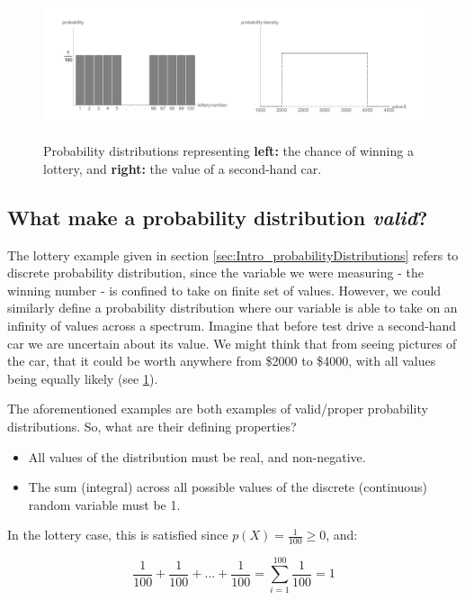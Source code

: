 \documentclass[11pt,fullpage]{book}
\begin{document}
\begin{figure}
\centering
\scalebox{0.3} 
{\includegraphics{Intro_lotterySecondhandCarProbability.pdf}}
\caption{Probability distributions representing \textbf{left:} the chance of winning a lottery, and \textbf{right:} the value of a second-hand car.}\label{fig:Intro_lotterySecondhandCarProbability}
\end{figure}

\subsection{What make a probability distribution \textit{valid}?}\label{sec:Intro_validProbabilityDistribution}
The lottery example given in section \ref{sec:Intro_probabilityDistributions} refers to discrete probability distribution, since the variable we were measuring - the winning number - is confined to take on finite set of values. However, we could similarly define a probability distribution where our variable is able to take on an infinity of values across a spectrum. Imagine that before test drive a second-hand car we are uncertain about its value. We might think that from seeing pictures of the car, that it could be worth anywhere from \$2000 to \$4000, with all values being equally likely (see \ref{fig:Intro_lotterySecondhandCarProbability}).

The aforementioned examples are both examples of valid/proper probability distributions. So, what are their defining properties?

\begin{itemize}
\item All values of the distribution must be real, and non-negative.
\item The sum (integral) across all possible values of the discrete (continuous) random variable must be 1.
\end{itemize}

In the lottery case, this is satisfied since $p(X)=\frac{1}{100}\geq 0$, and:

\begin{equation}
\frac{1}{100} + \frac{1}{100} + ... + \frac{1}{100} = \sum\limits_{i=1}^{100} \frac{1}{100} = 1
\end{equation}
\end{document}
